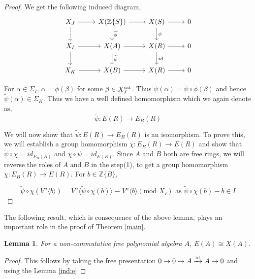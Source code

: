 \documentclass[11pt]{amsart}
\theoremstyle{plain}
\newtheorem{lemma}[thm]{Lemma}
\theoremstyle{definition}
\renewcommand{\tilde}{\widetilde}
\newcommand{\sat}{{\rm sat}}
\newcommand{\Z}{{\mathbb Z}}
\newcommand{\ab}[1]{\langle {#1} \rangle}
\begin{document}
\begin{proof}
\noindent We get the following induced diagram,
\[\begin{tikzcd} \label{diag2}
 X_J \arrow[d, dashed] \arrow[r] & X(\Z\{S\}) \arrow[d, "\tilde{\phi}", dashed] \arrow[r] & X(S) \arrow[d, "\phi"] \arrow[r] & 0 \\
 X_I \arrow[r] \arrow[d]  & X(A) \arrow[r]\arrow[d, "\tilde{\psi}"]           & X(R) \arrow[r]\arrow[d, "id"]          & 0 \\
 X_K \arrow[r]           & X(B) \arrow[r]           & X(R) \arrow[r]           & 0
\end{tikzcd}\]

\noindent For $\alpha \in \Sigma_I$, $\alpha = \tilde{\phi}(\beta)$ for some $\beta \in X_J^{\sat}$. Thus $\tilde{\psi}(\alpha) = \tilde{\psi} \circ \tilde{\phi}(\beta)$ and hence $\tilde{\psi}(\alpha) \in \Sigma_K$. Thus we have a well defined homomorphism which we again denote as, 
$$\tilde{\psi} : E(R) \to E_B(R)$$

 We will now show that $\tilde{\psi}: E(R) \to E_B(R)$ is an isomorphism. To prove this, we will establish a group homomorphism $\chi: E_B(R) \to E(R)$ and show that $\tilde{\psi} \circ \chi = id_{E_B(R)}$ and $\chi \circ \psi = id_{E(R)}$. Since $A$ and $B$ both are free rings,  we will reverse the roles of $A$ and $B$ in the step(1), to get a group homomorphism $\chi: E_B(R) \to E(R)$.  For $b \in \Z\{B\}$,

$$\tilde{\psi} \circ \chi(V^n\ab{b}) = V^n\ab{\tilde{\psi} \circ \chi(b)} \equiv V^n\ab{b} ( \text{mod } X_I) \text{ as }  \tilde{\psi} \circ \chi(b)-b \in I $$
\end{proof}

\noindent The following result, which is consequence of the above lemma, plays an important role in the proof of Theorem \ref{main}. 

\begin{lemma}\label{EisX}For a non-commutative free polynomial algebra $A$, $E(A) \cong X(A)$.
\end{lemma}
\begin{proof} This follows by taking the free presentation $0 \to 0 \to A \xrightarrow{{\rm id}} A \to 0$ and using the Lemma \ref{ind:e} 
\end{proof}
\end{document}
